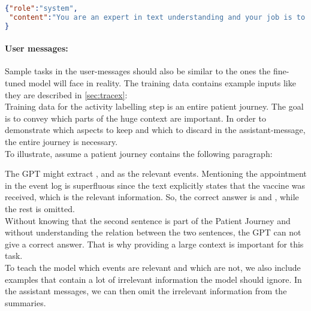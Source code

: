 \begin{lstlisting}[language=json, caption={System message for determining an activities start timestamp}, label={lst:system:starttime}]
{"role":"system",
 "content":"You are an expert in text understanding and your job is to take a given text and a given activity label and to extract a start date to this activity label. Only output the extracted start date! Rely on the context to determine the start date, as it might not be explicitly mentioned."
}
\end{lstlisting}

\paragraph{User messages:}\label{par:user-messages} Sample tasks in the user-messages should also be similar to the ones the fine-tuned model will face in reality. The training data contains example inputs like they are described in \autoref{sec:tracex}:\\
Training data for the activity labelling step is an entire patient journey. The goal is to convey which parts of the huge context are important. In order to demonstrate which aspects to keep and which to discard in the assistant-message, the entire journey is necessary.\\
To illustrate, assume a patient journey contains the following paragraph:
\begin{quote}
\end{quote}
The GPT might extract  ,  and  as the relevant events. Mentioning the appointment in the event log is superfluous since the text explicitly states that the vaccine was received, which is the relevant information. So, the correct answer is  and , while the rest is omitted.\\
Without knowing that the second sentence is part of the Patient Journey and without understanding the relation between the two sentences, the GPT can not give a correct answer. That is why providing a large context is important for this task.\\
To teach the model which events are relevant and which are not, we also include examples that contain a lot of irrelevant information the model should ignore. In the assistant messages, we can then omit the irrelevant information from the summaries.\\
